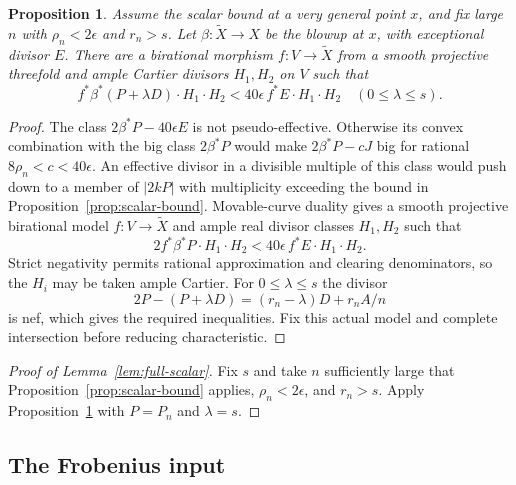 \documentclass[12pt,a4paper,psamsfonts]{amsart}
\theoremstyle{definition}
\theoremstyle{plain}
\newtheorem{proposition}[lemma]{Proposition}
\begin{document}
\begin{proposition}\label{prop:movable-from-scalar}
Assume the scalar bound at a very general point $x$, and fix
large $n$ with $\rho_n<2\epsilon$ and $r_n>s$.
Let $\beta:\widetilde X\to X$ be the blowup at $x$, with exceptional
divisor $E$. There are a birational morphism $f:V\to\widetilde X$
from a smooth projective threefold and ample Cartier divisors
$H_1,H_2$ on $V$ such that
\[
 f^*\beta^*(P+\lambda D)\cdot H_1\cdot H_2
 <40\epsilon\,f^*E\cdot H_1\cdot H_2
 \quad(0\le\lambda\le s).
\]
\end{proposition}
\begin{proof}
The class $2\beta^*P-40\epsilon E$ is not pseudo-effective.
Otherwise its convex combination with the big class $2\beta^*P$
would make $2\beta^*P-cJ$ big for rational
$8\rho_n<c<40\epsilon$. An effective divisor in a divisible
multiple of this class would push down to a member of $|2kP|$
with multiplicity exceeding the bound in
Proposition~\ref{prop:scalar-bound}.
Movable-curve duality \cite{BDPP} gives a smooth projective
birational model $f:V\to\widetilde X$ and ample real divisor classes
$H_1,H_2$ such that
\[
 2f^*\beta^*P\cdot H_1\cdot H_2
 <40\epsilon\,f^*E\cdot H_1\cdot H_2.
\]
Strict negativity permits rational approximation and clearing
denominators, so the $H_i$ may be taken ample Cartier.
For $0\le\lambda\le s$ the divisor
\[
 2P-(P+\lambda D)=(r_n-\lambda)D+r_nA/n
\]
is nef, which gives the required inequalities.
Fix this actual model and complete intersection before
reducing characteristic.
\end{proof}


\begin{proof}[Proof of Lemma~\ref{lem:full-scalar}]
Fix $s$ and take $n$ sufficiently large that
Proposition~\ref{prop:scalar-bound} applies, $\rho_n<2\epsilon$,
and $r_n>s$. Apply Proposition~\ref{prop:movable-from-scalar}
with $P=P_n$ and $\lambda=s$.
\end{proof}

\subsection{The Frobenius input}\label{sec:frobenius}
\end{document}
